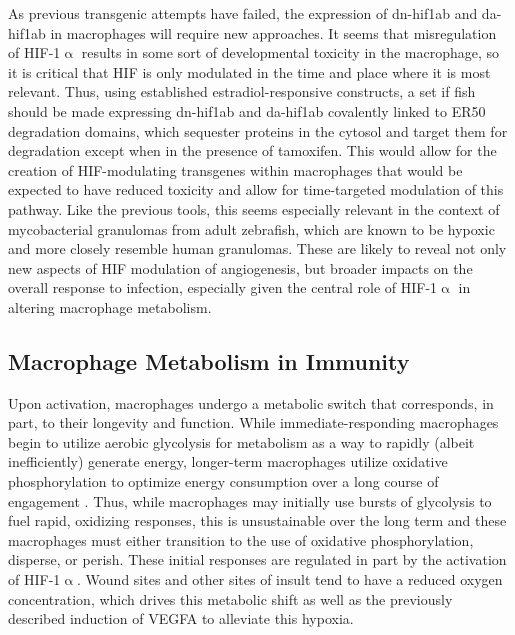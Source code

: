 As previous transgenic attempts have failed, the expression of dn-hif1ab and da-hif1ab in macrophages will require new approaches. It seems that misregulation of HIF-1$\upalpha$ results in some sort of developmental toxicity in the macrophage, so it is critical that HIF is only modulated in the time and place where it is most relevant. Thus, using established estradiol-responsive constructs, a set if fish should be made expressing dn-hif1ab and da-hif1ab covalently linked to ER50 degradation domains, which sequester proteins in the cytosol and target them for degradation except when in the presence of tamoxifen. This would allow for the creation of HIF-modulating transgenes within macrophages that would be expected to have reduced toxicity and allow for time-targeted modulation of this pathway. Like the previous tools, this seems especially relevant in the context of mycobacterial granulomas from adult zebrafish, which are known to be hypoxic and more closely resemble human granulomas. These are likely to reveal not only new aspects of HIF modulation of angiogenesis, but broader impacts on the overall response to infection, especially given the central role of HIF-1$\upalpha$ in altering macrophage metabolism.

\subsection{Macrophage Metabolism in Immunity}

Upon activation, macrophages undergo a metabolic switch that corresponds, in part, to their longevity and function. While immediate-responding macrophages begin to utilize aerobic glycolysis for metabolism as a way to rapidly (albeit inefficiently) generate energy, longer-term macrophages utilize oxidative phosphorylation to optimize energy consumption over a long course of engagement \citep{Kiran2016}. Thus, while macrophages may initially use bursts of glycolysis to fuel rapid, oxidizing responses, this is unsustainable over the long term and these macrophages must either transition to the use of oxidative phosphorylation, disperse, or perish. These initial responses are regulated in part by the activation of HIF-1$\upalpha$. Wound sites and other sites of insult tend to have a reduced oxygen concentration, which drives this metabolic shift as well as the previously described induction of VEGFA to alleviate this hypoxia. 

